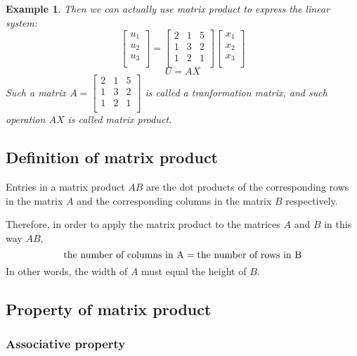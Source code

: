 \documentclass{article}
\newtheorem{example}{Example}
\begin{document}
\begin{example}
  Then we can actually use matrix product to express the linear system:
  \[
    \begin{bmatrix}
      u_1 \\
      u_2 \\
      u_3 \\
    \end{bmatrix}
    = 
    \begin{bmatrix}
      2 & 1 & 5 \\
      1 & 3 & 2 \\
      1 & 2 & 1 \\
    \end{bmatrix}
    \begin{bmatrix}
      x_1 \\
      x_2 \\
      x_3 \\
    \end{bmatrix}
  \]
  \[
    U = AX
  \]
  Such a matrix $A = \begin{bmatrix}
                       2 & 1 & 5 \\
                       1 & 3 & 2 \\
                       1 & 2 & 1 \\
                     \end{bmatrix}$ is called a tranformation matrix, and such 
  operation $AX$ is called matrix product.
\end{example}

\subsection{Definition of matrix product}

Entries in a matrix product $AB$ are the dot products of the corresponding rows 
in the matrix $A$ and the corresponding columns in the matrix $B$ respectively.

Therefore, in order to apply the matrix product to the matrices $A$ and $B$ in 
this way $AB$,
\[
  \textnormal{the number of columns in A} = \textnormal{the number of rows in B}
\]
In other words, the width of $A$ must equal the height of $B$.

\subsection{Property of matrix product}

\subsubsection{Associative property}
\end{document}
